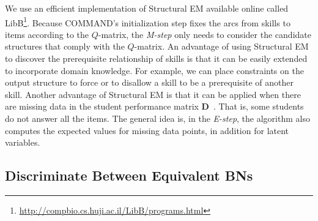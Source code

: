 \documentclass{edm_template}
\begin{document}
We use an efficient implementation of Structural EM available online called LibB\footnote{\url{http://compbio.cs.huji.ac.il/LibB/programs.html}}.
Because COMMAND's initialization step
fixes the arcs from skills to items according to the ${Q}$-matrix,
the \emph{M-step} only needs to consider the candidate structures that comply with the ${Q}$-matrix.
An advantage of using Structural EM to discover the prerequisite relationship of skills is that it can be easily extended to incorporate domain knowledge.
For example, we can  place constraints on the output structure to force or to disallow a skill to be a prerequisite of another skill.
Another advantage of Structural EM is that it can be applied when there are missing data in the student performance matrix $\mathbf{D}$~\cite{friedman1997learning}. 
That is, some students do not answer all the items.
The general idea is, in the \emph{E-step}, the algorithm also computes the expected values for missing data points, in addition for latent variables. 



\subsection{Discriminate Between Equivalent BNs}
\label{sec:discriminatebns}
\end{document}
